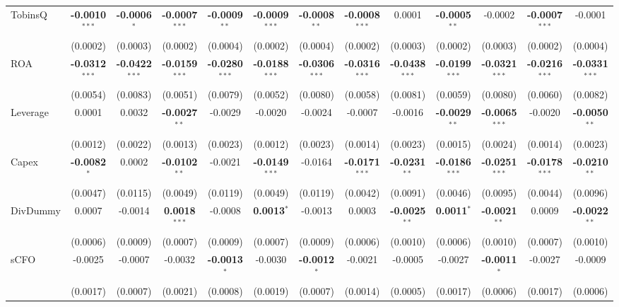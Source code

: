 \begin{landscape}
\begin{table}[H]
\begin{tabular}{lcccccccccccc}
TobinsQ & \textbf{-0.0010}$^{***}$ & \textbf{-0.0006}$^{*}$ & \textbf{-0.0007}$^{***}$ & \textbf{-0.0009}$^{**}$ & \textbf{-0.0009}$^{***}$ & \textbf{-0.0008}$^{**}$ & \textbf{-0.0008}$^{***}$ & 0.0001 & \textbf{-0.0005}$^{**}$ & -0.0002 & \textbf{-0.0007}$^{***}$ & -0.0001 \\
 & (0.0002) & (0.0003) & (0.0002) & (0.0004) & (0.0002) & (0.0004) & (0.0002) & (0.0003) & (0.0002) & (0.0003) & (0.0002) & (0.0004) \\
ROA & \textbf{-0.0312}$^{***}$ & \textbf{-0.0422}$^{***}$ & \textbf{-0.0159}$^{***}$ & \textbf{-0.0280}$^{***}$ & \textbf{-0.0188}$^{***}$ & \textbf{-0.0306}$^{***}$ & \textbf{-0.0316}$^{***}$ & \textbf{-0.0438}$^{***}$ & \textbf{-0.0199}$^{***}$ & \textbf{-0.0321}$^{***}$ & \textbf{-0.0216}$^{***}$ & \textbf{-0.0331}$^{***}$ \\
 & (0.0054) & (0.0083) & (0.0051) & (0.0079) & (0.0052) & (0.0080) & (0.0058) & (0.0081) & (0.0059) & (0.0080) & (0.0060) & (0.0082) \\
Leverage & 0.0001 & 0.0032 & \textbf{-0.0027}$^{**}$ & -0.0029 & -0.0020 & -0.0024 & -0.0007 & -0.0016 & \textbf{-0.0029}$^{**}$ & \textbf{-0.0065}$^{***}$ & -0.0020 & \textbf{-0.0050}$^{**}$ \\
 & (0.0012) & (0.0022) & (0.0013) & (0.0023) & (0.0012) & (0.0023) & (0.0014) & (0.0023) & (0.0015) & (0.0024) & (0.0014) & (0.0023) \\
Capex & \textbf{-0.0082}$^{*}$ & 0.0002 & \textbf{-0.0102}$^{**}$ & -0.0021 & \textbf{-0.0149}$^{***}$ & -0.0164 & \textbf{-0.0171}$^{***}$ & \textbf{-0.0231}$^{**}$ & \textbf{-0.0186}$^{***}$ & \textbf{-0.0251}$^{***}$ & \textbf{-0.0178}$^{***}$ & \textbf{-0.0210}$^{**}$ \\
 & (0.0047) & (0.0115) & (0.0049) & (0.0119) & (0.0049) & (0.0119) & (0.0042) & (0.0091) & (0.0046) & (0.0095) & (0.0044) & (0.0096) \\
DivDummy & 0.0007 & -0.0014 & \textbf{0.0018}$^{***}$ & -0.0008 & \textbf{0.0013}$^{*}$ & -0.0013 & 0.0003 & \textbf{-0.0025}$^{**}$ & \textbf{0.0011}$^{*}$ & \textbf{-0.0021}$^{**}$ & 0.0009 & \textbf{-0.0022}$^{**}$ \\
 & (0.0006) & (0.0009) & (0.0007) & (0.0009) & (0.0007) & (0.0009) & (0.0006) & (0.0010) & (0.0006) & (0.0010) & (0.0007) & (0.0010) \\
sCFO & -0.0025 & -0.0007 & -0.0032 & \textbf{-0.0013}$^{*}$ & -0.0030 & \textbf{-0.0012}$^{*}$ & -0.0021 & -0.0005 & -0.0027 & \textbf{-0.0011}$^{*}$ & -0.0027 & -0.0009 \\
 & (0.0017) & (0.0007) & (0.0021) & (0.0008) & (0.0019) & (0.0007) & (0.0014) & (0.0005) & (0.0017) & (0.0006) & (0.0017) & (0.0006) \\

\end{tabular}
\end{table}
\end{landscape}

